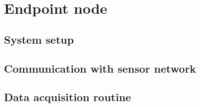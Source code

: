 \chapter{Endpoint node}
\label{chap:endpoint}

\section{System setup}
\section{Communication with sensor network}
\section{Data acquisition routine}
